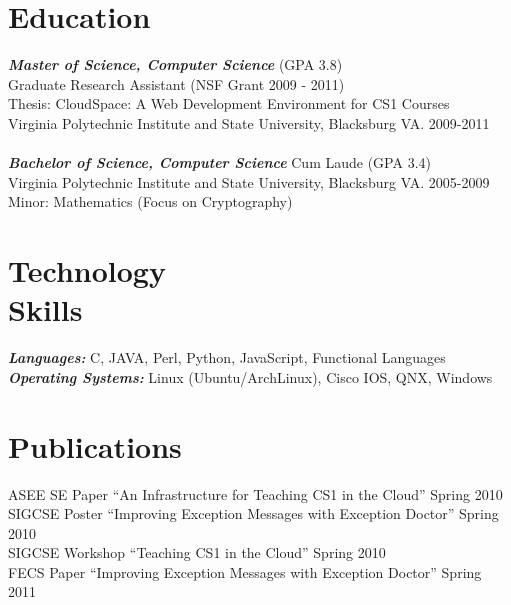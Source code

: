 \documentclass[line,margin]{res}
\begin{document}
\begin{resume}
 
\section{Education} 
        \textbf{\emph{Master of Science, Computer Science}} (GPA 3.8) \\
        Graduate Research Assistant (NSF Grant 2009 - 2011) \\
        Thesis:  CloudSpace: A Web Development Environment for CS1 Courses \\
        Virginia Polytechnic Institute and State University, Blacksburg VA. 2009-2011 \\
\\[-5pt]
        \textbf{\emph{Bachelor of Science, Computer Science}} Cum Laude (GPA 3.4) \\
        Virginia Polytechnic Institute and State University, Blacksburg VA. 2005-2009 \\
        Minor: Mathematics (Focus on Cryptography)

\section{Technology \\ Skills} \textbf{\emph{Languages:}} C, JAVA, Perl, Python, JavaScript, Functional Languages \\
                \textbf{\emph{Operating Systems:}} Linux (Ubuntu/ArchLinux), Cisco IOS, QNX, Windows \\

\section{Publications}
ASEE SE Paper ``An Infrastructure for Teaching CS1 in the Cloud'' Spring 2010 \\
SIGCSE Poster ``Improving Exception Messages with Exception Doctor'' Spring 2010 \\
SIGCSE Workshop ``Teaching CS1 in the Cloud'' Spring 2010 \\
FECS Paper ``Improving Exception Messages with Exception Doctor'' Spring 2011


\end{resume}
\end{document}
